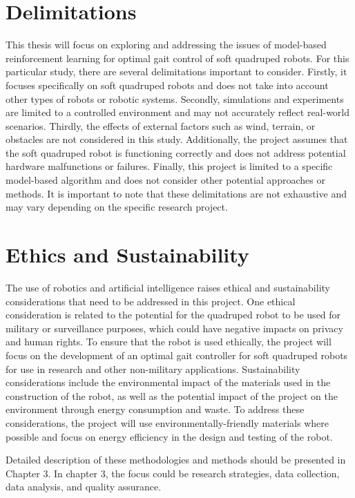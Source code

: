 \section{Delimitations}
 This thesis will focus on exploring and addressing the issues of model-based reinforcement learning for optimal gait control of soft quadruped robots. For this particular study, there are several delimitations important to consider. Firstly, it focuses specifically on soft quadruped robots and does not take into account other types of robots or robotic systems. Secondly, simulations and experiments are limited to a controlled environment and may not accurately reflect real-world scenarios. Thirdly, the effects of external factors such as wind, terrain, or obstacles are not considered in this study. Additionally, the project assumes that the soft quadruped robot is functioning correctly and does not address potential hardware malfunctions or failures. Finally, this project is limited to a specific model-based  algorithm and does not consider other potential approaches or methods. It is important to note that these delimitations are not exhaustive and may vary depending on the specific research project. 
 
\section{Ethics and Sustainability}
The use of robotics and artificial intelligence raises ethical and sustainability considerations that need to be addressed in this project. One ethical consideration is related to the potential for the quadruped robot to be used for military or surveillance purposes, which could have negative impacts on privacy and human rights. To ensure that the robot is used ethically, the project will focus on the development of an optimal gait controller for soft quadruped robots for use in research and other non-military applications. Sustainability considerations include the environmental impact of the materials used in the construction of the robot, as well as the potential impact of the project on the environment through energy consumption and waste. To address these considerations, the project will use environmentally-friendly materials where possible and focus on energy efficiency in the design and testing of the robot.


Detailed description of these methodologies and methods should be presented in Chapter 3. In chapter 3, the focus could be research strategies, data collection, data analysis, and quality assurance.

